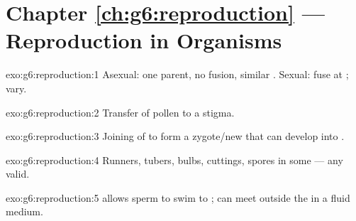 \section*{Chapter \ref{ch:g6:reproduction} --- Reproduction in Organisms}

\begin{solution}{exo:g6:reproduction:1}
Asexual: one parent, no  fusion, similar . Sexual:
 fuse at ;  vary.
\end{solution}

\begin{solution}{exo:g6:reproduction:2}
Transfer of pollen to a stigma.
\end{solution}

\begin{solution}{exo:g6:reproduction:3}
Joining of  to form a zygote/new  that can develop into
.
\end{solution}

\begin{solution}{exo:g6:reproduction:4}
Runners, tubers, bulbs, cuttings, spores in some  --- any valid.
\end{solution}

\begin{solution}{exo:g6:reproduction:5}
 allows sperm to swim to ;  can meet outside the 
in a fluid medium.
\end{solution}

